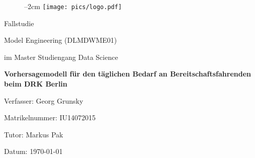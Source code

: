 
\label{titlePage}
\begin{figure}[h]
\centering
\advance\leftskip--2cm
\texttt{[image: pics/logo.pdf]}
\end{figure}
\FloatBarrier

\vspace*{5mm}

\begin{Large} 
\begin{center}
Fallstudie
\end{center}
\end{Large} 

\vspace*{5mm}

\begin{Large} 
\begin{center}
Model Engineering (DLMDWME01)
\end{center}
\end{Large} 

\begin{large} 
\begin{center}
im Master Studiengang Data Science
\end{center}
\end{large}

\vspace*{15mm}

\begin{Large} 
\begin{center}
\textbf{Vorhersagemodell für den täglichen Bedarf an Bereitschaftsfahrenden beim DRK Berlin}
\end{center}
\end{Large}



\vspace*{20mm}

\begin{large} 
\begin{center}
Verfasser: Georg Grunsky
\end{center}
\end{large} 

\vspace*{-6mm}

\begin{large} 
\begin{center}
Matrikelnummer: IU14072015
\end{center}
\end{large} 

\vspace*{-6mm}

\begin{large} 
\begin{center}
Tutor: Markus Pak
\end{center}
\end{large} 

\vspace*{-6mm}

\begin{large} 
\begin{center}
Datum: \today
\end{center}
\end{large} 


\pagestyle{empty} %

